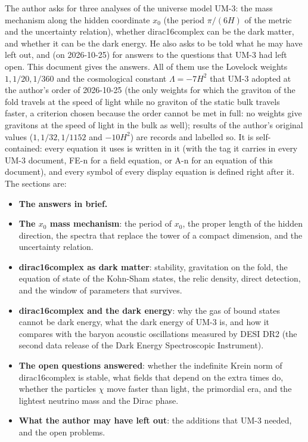 \documentclass[
  10pt,
]{article}
\providecommand{\tightlist}{%
  \setlength{\itemsep}{0pt}\setlength{\parskip}{0pt}}
\begin{document}
The author asks for three analyses of the universe model UM-3: the mass
mechanism along the hidden coordinate \(x_0\) (the period \(\pi/(6H)\)
of the metric and the uncertainty relation), whether dirac16complex can
be the dark matter, and whether it can be the dark energy. He also asks
to be told what he may have left out, and (on 2026-10-25) for answers to
the questions that UM-3 had left open. This document gives the answers.
All of them use the Lovelock weights \(1, 1/20, 1/360\) and the
cosmological constant \(\Lambda = -7H^2\) that UM-3 adopted at the
author's order of 2026-10-25 (the only weights for which the graviton of
the fold travels at the speed of light while no graviton of the static
bulk travels faster, a criterion chosen because the order cannot be met
in full: no weights give gravitons at the speed of light in the bulk as
well); results of the author's original values (\(1, 1/32, 1/1152\) and
\(-10H^2\)) are records and labelled so. It is self-contained: every
equation it uses is written in it (with the tag it carries in every UM-3
document, FE-n for a field equation, or A-n for an equation of this
document), and every symbol of every display equation is defined right
after it. The sections are:

\begin{itemize}
\tightlist
\item
  \textbf{The answers in brief.}
\item
  \textbf{The \(x_0\) mass mechanism}: the period of \(x_0\), the proper
  length of the hidden direction, the spectra that replace the tower of
  a compact dimension, and the uncertainty relation.
\item
  \textbf{dirac16complex as dark matter}: stability, gravitation on the
  fold, the equation of state of the Kohn-Sham states, the relic
  density, direct detection, and the window of parameters that survives.
\item
  \textbf{dirac16complex and the dark energy}: why the gas of bound
  states cannot be dark energy, what the dark energy of UM-3 is, and how
  it compares with the baryon acoustic oscillations measured by DESI DR2
  (the second data release of the Dark Energy Spectroscopic Instrument).
\item
  \textbf{The open questions answered}: whether the indefinite Krein
  norm of dirac16complex is stable, what fields that depend on the extra
  times do, whether the particles \(\chi\) move faster than light, the
  primordial era, and the lightest neutrino mass and the Dirac phase.
\item
  \textbf{What the author may have left out}: the additions that UM-3
  needed, and the open problems.
\end{itemize}
\end{document}

